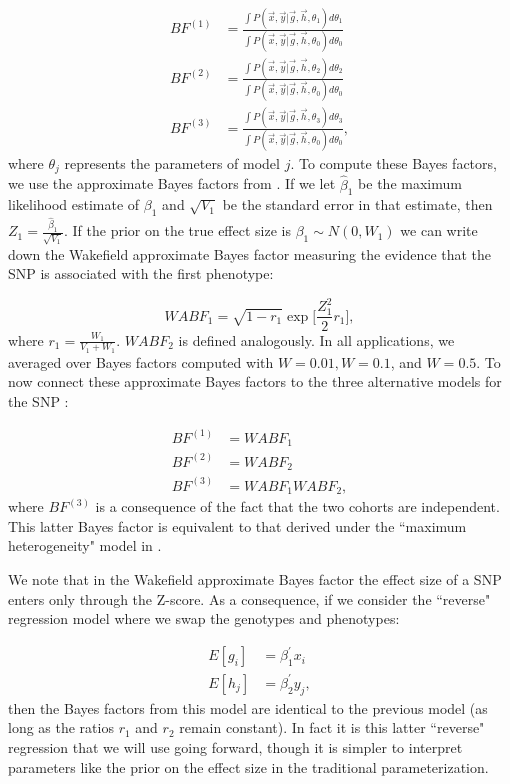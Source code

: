 \documentclass[11pt,titlepage]{article}
\begin{document}
\begin{align}
BF^{(1)}  &= \frac{\int P(\vec x, \vec y | \vec g, \vec h, \theta_1) d \theta_1}{\int P(\vec x, \vec y | \vec g, \vec h, \theta_0) d \theta_0} \\
BF^{(2)}  &= \frac{\int P(\vec x, \vec y| \vec g, \vec h, \theta_2) d \theta_2}{\int P(\vec x, \vec y | \vec g, \vec h,\theta_0) d \theta_0} \\
BF^{(3)}  &= \frac{\int P(\vec x, \vec y | \vec g,  \vec h,\theta_3) d \theta_3}{\int P(\vec x, \vec y | \vec g,\vec h, \theta_0) d \theta_0},
\end{align}
\noindent where $\theta_j$ represents the parameters of model $j$. To compute these Bayes factors, we use the approximate Bayes factors from \citet{Wakefield:2008hc}. If we let $\hat \beta_1$ be the maximum likelihood estimate of $\beta_1$ and $\sqrt{V_1}$ be the standard error in that estimate, then $Z_1 = \frac{\hat \beta_1}{\sqrt{V_1}}$. If the prior on the true effect size is $\beta_1 \sim N(0, W_1)$ we can write down the Wakefield approximate Bayes factor measuring the evidence that the SNP is associated with the first phenotype:

\begin{equation}
WABF_1 = \sqrt{1-r_1} \exp \bigg[ \frac{Z_1^2}{2} r_1 \bigg],
\end{equation}
\noindent where $r_1 = \frac{W_1}{V_1+W_1}$. $WABF_2$ is defined analogously. In all applications, we averaged over Bayes factors computed with $W = 0.01, W = 0.1$, and  $W = 0.5$. To now connect these approximate Bayes factors to the three alternative models for the SNP \citep{Giambartolomei:2014aa}:

\begin{align}
BF^{(1)}  &= WABF_1 \\
BF^{(2)}  &= WABF_2 \\
BF^{(3)}  &= WABF_1 WABF_2,
\end{align}
\noindent where $BF^{(3)}$ is a consequence of the fact that the two cohorts are independent. This latter Bayes factor is equivalent to that derived under the ``maximum heterogeneity" model in \citet{wen2014bayesian}. 

We note that in the Wakefield approximate Bayes factor the effect size of a SNP enters only through the Z-score. As a consequence, if we consider the ``reverse" regression model where we swap the genotypes and phenotypes:

\begin{align}
E[g_i] &= \beta_1^\prime x_i \\
E[h_j] &= \beta_2^{\prime} y_j,
\end{align}
\noindent then the Bayes factors from this model are identical to the previous model (as long as the ratios $r_1$ and $r_2$ remain constant). In fact it is this latter ``reverse" regression that we will use going forward, though it is simpler to interpret parameters like the prior on the effect size in the traditional parameterization. 
\end{document}
